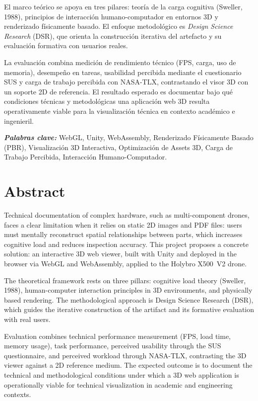 \documentclass[12pt,letterpaper]{article}
\begin{document}
El marco te\'orico se apoya en tres pilares: teor\'ia de la carga cognitiva (Sweller, 1988), principios de interacci\'on humano-computador en entornos 3D y renderizado f\'isicamente basado. El enfoque metodol\'ogico es \textit{Design Science Research} (DSR), que orienta la construcci\'on iterativa del artefacto y su evaluaci\'on formativa con usuarios reales.

La evaluaci\'on combina medici\'on de rendimiento t\'ecnico (FPS, carga, uso de memoria), desempe\~no en tareas, usabilidad percibida mediante el cuestionario SUS y carga de trabajo percibida con NASA-TLX, contrastando el visor 3D con un soporte 2D de referencia. El resultado esperado es documentar bajo qu\'e condiciones t\'ecnicas y metodol\'ogicas una aplicaci\'on web 3D resulta operativamente viable para la visualizaci\'on t\'ecnica en contexto acad\'emico e ingenieril.

\hspace{1.27cm}\textit{\textbf{Palabras clave:}} WebGL, Unity, WebAssembly, Renderizado F\'isicamente Basado (PBR), Visualizaci\'on 3D Interactiva, Optimizaci\'on de Assets 3D, Carga de Trabajo Percibida, Interacci\'on Humano-Computador.

\newpage

\section*{Abstract}
{}
\setlength{\parindent}{0pt}
Technical documentation of complex hardware, such as multi-component drones, faces a clear limitation when it relies on static 2D images and PDF files: users must mentally reconstruct spatial relationships between parts, which increases cognitive load and reduces inspection accuracy. This project proposes a concrete solution: an interactive 3D web viewer, built with Unity and deployed in the browser via WebGL and WebAssembly, applied to the Holybro X500~V2 drone.

The theoretical framework rests on three pillars: cognitive load theory (Sweller, 1988), human-computer interaction principles in 3D environments, and physically based rendering. The methodological approach is Design Science Research (DSR), which guides the iterative construction of the artifact and its formative evaluation with real users.

Evaluation combines technical performance measurement (FPS, load time, memory usage), task performance, perceived usability through the SUS questionnaire, and perceived workload through NASA-TLX, contrasting the 3D viewer against a 2D reference medium. The expected outcome is to document the technical and methodological conditions under which a 3D web application is operationally viable for technical visualization in academic and engineering contexts.
\end{document}
